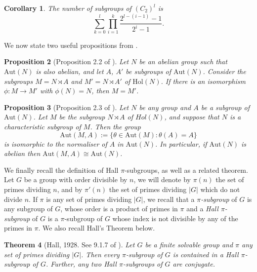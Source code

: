 \documentclass[a4paper,reqno]{amsart}
\newtheorem{theorem}{Theorem}[section]
\newtheorem{proposition}[theorem]{Proposition}
\newtheorem{corollary}[theorem]{Corollary}
\theoremstyle{definition}
\newcommand{\Aut}{\mathrm{Aut}}
\newcommand{\Hol}{\mathrm{Hol}}
\begin{document}
\begin{corollary}\label{c_2_subgroups}
    The number of subgroups of $(C_2)^l$ is
    \[\sum_{k=0}^l\prod_{i=1}^k\frac{2^{l-(i-1)}-1}{2^i-1}.\]
\end{corollary}
We now state two useful propositions from \cite{BML21}.
\begin{proposition}[Proposition 2.2 of \cite{BML21}]\label{ab-aut}
    Let $N$ be an abelian group such that $\Aut(N)$ is also abelian, and let $A$, $A'$ be subgroups of $\Aut(N)$. Consider the subgroups $M=N \rtimes A$ and $M'=N \rtimes A'$ of $\Hol(N)$. If there is an isomorphism $\phi: M \to M'$ with $\phi(N)=N$, then $M=M'$.
\end{proposition}
\begin{proposition}[Proposition 2.3 of \cite{BML21}]\label{rel-aut-char}
    Let $N$ be any group and $A$ be a subgroup of $\Aut(N)$. Let $M$ be the
    subgroup $N \rtimes A$ of $Hol(N)$, and suppose that $N$ is a characteristic subgroup of $M$. Then the group
    \[\Aut(M,A) := \{ \theta \in \Aut(M) : \theta(A)=A\}\] 
    is isomorphic to the normaliser of $A$ in $\Aut(N)$. In particular, if $\Aut(N)$ is abelian then $\Aut(M,A) \cong \Aut(N)$.
\end{proposition}
We finally recall the definition of Hall $\pi$-subgroups, as well as a related theorem. Let $G$ be a group with order divisible by $n$, we will denote by $\pi(n)$ the set of primes dividing $n$, and by $\pi'(n)$ the set of primes dividing $|G|$ which do not divide $n$. If $\pi$ is any set of primes dividing $|G|$, we recall that a \textit{$\pi$-subgroup} of $G$ is any subgroup of $G$, whose order is a product of primes in $\pi$ and a \textit{Hall $\pi$-subgroup} of $G$ is a $\pi$-subgroup of $G$ whose index is not divisible by any of the primes in $\pi$. We also recall Hall's Theorem below.
\begin{theorem}[Hall, 1928. See 9.1.7 of \cite{Rob96}]
    Let $G$ be a finite solvable group and $\pi$ any set of primes dividing $|G|$. Then every $\pi$-subgroup of $G$ is contained in a Hall $\pi$-subgroup of $G$. Further, any two Hall $\pi$-subgroups of $G$ are conjugate.
\end{theorem}
\end{document}
